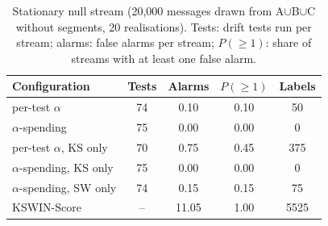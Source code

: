 \begin{table}[t]
\centering
\caption{Stationary null stream (20{,}000 messages drawn from A$\cup$B$\cup$C without segments, 20 realisations). Tests: drift tests run per stream; alarms: false alarms per stream; $P(\geq1)$: share of streams with at least one false alarm.}
\label{tab:rev-null}
\scriptsize
\setlength{\tabcolsep}{3pt}
\begin{tabular}{@{}lcccc@{}}
\toprule
Configuration & Tests & Alarms & $P(\geq 1)$ & Labels \\
\midrule
per-test $\alpha$ & 74 & 0.10 & 0.10 & 50 \\
$\alpha$-spending & 75 & 0.00 & 0.00 & 0 \\
per-test $\alpha$, KS only & 70 & 0.75 & 0.45 & 375 \\
$\alpha$-spending, KS only & 75 & 0.00 & 0.00 & 0 \\
$\alpha$-spending, SW only & 74 & 0.15 & 0.15 & 75 \\
KSWIN-Score & -- & 11.05 & 1.00 & 5525 \\
\bottomrule
\end{tabular}
\end{table}
